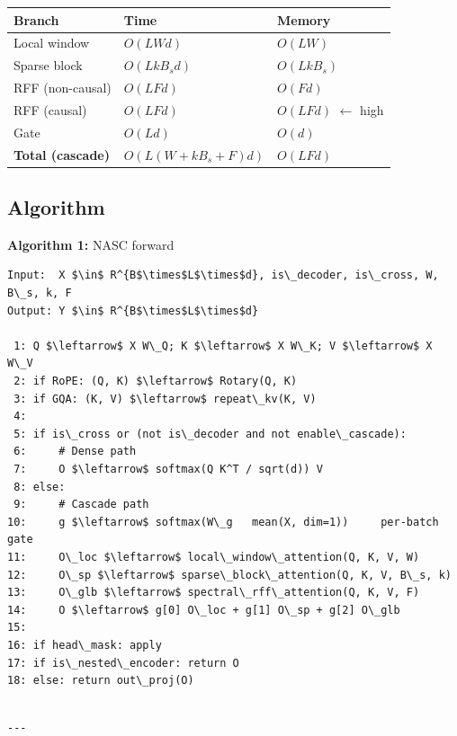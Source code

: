 \begin{table}[H]
\centering
\small
\begin{tabular}{lll}
\toprule
\textbf{Branch} & \textbf{Time} & \textbf{Memory} \\
\midrule
Local window & $O(L W d)$ & $O(L W)$ \\
Sparse block & $O(L k B_s d)$ & $O(L k B_s)$ \\
RFF (non-causal) & $O(L F d)$ & $O(F d)$ \\
RFF (causal) & $O(L F d)$ & $O(L F d)$ $\leftarrow$ high \\
Gate & $O(L d)$ & $O(d)$ \\
\textbf{Total (cascade)} & $O(L(W + k B_s + F) d)$ & $O(L F d)$ \\
\bottomrule
\end{tabular}
\end{table}

\subsection{Algorithm}

\textbf{Algorithm 1:} NASC forward
\begin{lstlisting}
Input:  X $\in$ R^{B$\times$L$\times$d}, is\_decoder, is\_cross, W, B\_s, k, F
Output: Y $\in$ R^{B$\times$L$\times$d}

 1: Q $\leftarrow$ X W\_Q; K $\leftarrow$ X W\_K; V $\leftarrow$ X W\_V
 2: if RoPE: (Q, K) $\leftarrow$ Rotary(Q, K)
 3: if GQA: (K, V) $\leftarrow$ repeat\_kv(K, V)
 4:
 5: if is\_cross or (not is\_decoder and not enable\_cascade):
 6:     # Dense path
 7:     O $\leftarrow$ softmax(Q K^T / sqrt(d)) V
 8: else:
 9:     # Cascade path
10:     g $\leftarrow$ softmax(W\_g   mean(X, dim=1))     per-batch gate
11:     O\_loc $\leftarrow$ local\_window\_attention(Q, K, V, W)
12:     O\_sp $\leftarrow$ sparse\_block\_attention(Q, K, V, B\_s, k)
13:     O\_glb $\leftarrow$ spectral\_rff\_attention(Q, K, V, F)
14:     O $\leftarrow$ g[0] O\_loc + g[1] O\_sp + g[2] O\_glb
15:
16: if head\_mask: apply
17: if is\_nested\_encoder: return O
18: else: return out\_proj(O)
\end{lstlisting}
\begin{lstlisting}

---
\end{lstlisting}